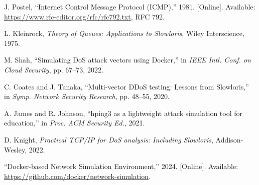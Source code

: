\documentclass[conference]{IEEEtran}
\begin{document}
\begin{thebibliography}{99}
J. Postel, ``Internet Control Message Protocol (ICMP),'' 1981. [Online]. Available: \url{https://www.rfc-editor.org/rfc/rfc792.txt}, RFC 792.

L. Kleinrock, \textit{Theory of Queues: Applications to Slowloris}, Wiley Interscience, 1975.

M. Shah, ``Simulating DoS attack vectors using Docker,'' in \textit{IEEE Intl. Conf. on Cloud Security}, pp. 67--73, 2022.

C. Coates and J. Tanaka, ``Multi-vector DDoS testing: Lessons from Slowloris,'' in \textit{Symp. Network Security Research}, pp. 48--55, 2020.

A. James and R. Johnson, ``hping3 as a lightweight attack simulation tool for education,'' in \textit{Proc. ACM Security Ed.}, 2021.

D. Knight, \textit{Practical TCP/IP for DoS analysis: Including Slowloris}, Addison-Wesley, 2022.

``Docker-based Network Simulation Environment,'' 2024. [Online]. Available: \url{https://github.com/docker/network-simulation}.

\end{thebibliography}
\end{document}
